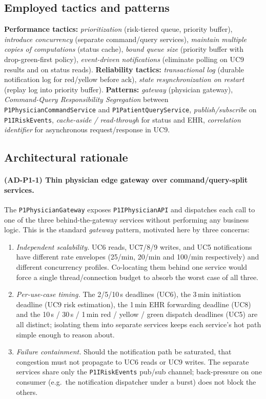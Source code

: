 \subsection*{Employed tactics and patterns}
\textbf{Performance tactics:} \emph{prioritization} (risk-tiered queue,
priority buffer), \emph{introduce concurrency} (separate command/query
services), \emph{maintain multiple copies of computations} (status cache),
\emph{bound queue size} (priority buffer with drop-green-first policy),
\emph{event-driven notifications} (eliminate polling on UC9 results and
on status reads).
\textbf{Reliability tactics:} \emph{transactional log} (durable
notification log for red/yellow before ack), \emph{state resynchronization
on restart} (replay log into priority buffer).
\textbf{Patterns:} \emph{gateway} (physician gateway),
\emph{Command-Query Responsibility Segregation} between
\texttt{P1PhysicianCommandService} and \texttt{P1PatientQueryService},
\emph{publish/subscribe} on \texttt{P1IRiskEvents}, \emph{cache-aside /
read-through} for status and EHR, \emph{correlation identifier} for
asynchronous request/response in UC9.

\subsection*{Architectural rationale}

\paragraph{(AD-P1-1) Thin physician edge gateway over command/query-split
services.}
The \texttt{P1PhysicianGateway} exposes \texttt{P1IPhysicianAPI} and
dispatches each call to one of the three behind-the-gateway services
without performing any business logic. This is the standard \emph{gateway}
pattern, motivated here by three concerns:
\begin{enumerate}
  \item \emph{Independent scalability.} UC6 reads, UC7/8/9 writes, and
        UC5 notifications have different rate envelopes (25/min, 20/min
        and 100/min respectively) and different concurrency
        profiles. Co-locating them behind one service would force a
        single thread/connection budget to absorb the worst case of all
        three.
  \item \emph{Per-use-case timing.} The 2/5/10\,s deadlines (UC6), the
        3\,min initiation deadline (UC9 risk estimation), the 1\,min EHR
        forwarding deadline (UC8) and the 10\,s / 30\,s / 1\,min red /
        yellow / green dispatch deadlines (UC5) are all distinct;
        isolating them into separate services keeps each service's hot
        path simple enough to reason about.
  \item \emph{Failure containment.} Should the notification path be
        saturated, that congestion must not propagate to UC6 reads or UC9
        writes. The separate services share only the
        \texttt{P1IRiskEvents} pub/sub channel; back-pressure on one
        consumer (e.g.\ the notification dispatcher under a burst) does
        not block the others.
\end{enumerate}

